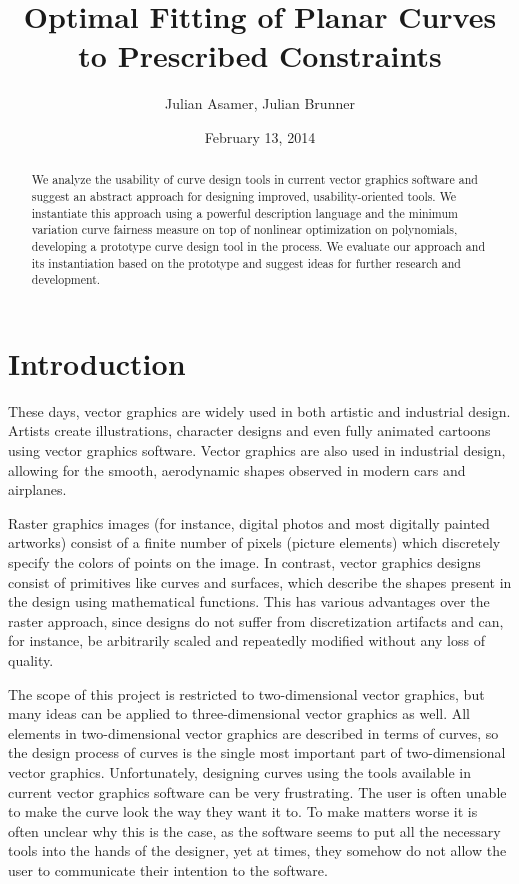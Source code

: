 \documentclass[a4paper]{article}
\title{Optimal Fitting of Planar Curves to Prescribed Constraints}
\author{Julian Asamer, Julian Brunner}
\date{February 13, 2014}
\begin{document}
	\maketitle

	\begin{abstract}

		\noindent We analyze the usability of curve design tools in current vector graphics software and suggest an abstract approach for designing improved, usability-oriented tools. We instantiate this approach using a powerful description language and the minimum variation curve fairness measure on top of nonlinear optimization on polynomials, developing a prototype curve design tool in the process. We evaluate our approach and its instantiation based on the prototype and suggest ideas for further research and development.

	\end{abstract}

	\section{Introduction}
	\label{section:introduction}

		These days, vector graphics are widely used in both artistic and industrial design. Artists create illustrations, character designs and even fully animated cartoons using vector graphics software. Vector graphics are also used in industrial design, allowing for the smooth, aerodynamic shapes observed in modern cars and airplanes.

		Raster graphics images (for instance, digital photos and most digitally painted artworks) consist of a finite number of pixels (picture elements) which discretely specify the colors of points on the image. In contrast, vector graphics designs consist of primitives like curves and surfaces, which describe the shapes present in the design using mathematical functions. This has various advantages over the raster approach, since designs do not suffer from discretization artifacts and can, for instance, be arbitrarily scaled and repeatedly modified without any loss of quality.

		The scope of this project is restricted to two-dimensional vector graphics, but many ideas can be applied to three-dimensional vector graphics as well. All elements in two-dimensional vector graphics are described in terms of curves, so the design process of curves is the single most important part of two-dimensional vector graphics. Unfortunately, designing curves using the tools available in current vector graphics software can be very frustrating. The user is often unable to make the curve look the way they want it to. To make matters worse it is often unclear why this is the case, as the software seems to put all the necessary tools into the hands of the designer, yet at times, they somehow do not allow the user to communicate their intention to the software.
\end{document}
